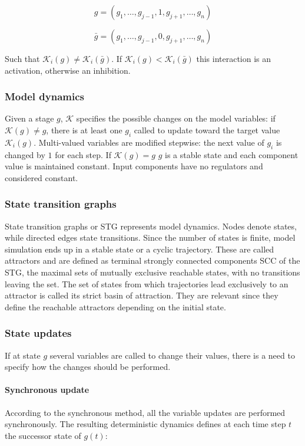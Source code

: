     $$g = (g_1, \dots, g_{j-1}, 1, g_{j+1}, \dots, g_n)$$

    $$\bar{g} = (g_1, \dots, g_{j-1}, 0, g_{j+1}, \dots, g_n)$$

    Such that $\mathcal{K}_i(g)\neq\mathcal{K}_i(\bar{g})$.
    If $\mathcal{K}_i(g)<\mathcal{K}_i(\bar{g})$ this interaction is an activation, otherwise an inhibition.

    \subsubsection{Model dynamics}
    Given a stage $g$, $\mathcal{K}$ specifies the possible changes on the model variables: if $\mathcal{K}(g)\neq g$, there is at least one $g_i$ called to update toward the target value $\mathcal{K}_i(g)$.
    Multi-valued variables are modified stepwise: the next value of $g_i$ is changed by $1$ for each step.
    If $\mathcal{K}(g) = g$ $g$ is a stable state and each component value is maintained constant.
    Input components have no regulators and considered constant.

    \subsubsection{State transition graphs}
    State transition graphs or STG represents model dynamics.
    Nodes denote states, while directed edges state transitions.
    Since the number of states is finite, model simulation ends up in a stable state or a cyclic trajectory.
    These are called attractors and are defined as terminal strongly connected components SCC of the STG, the maximal sets of mutually exclusive reachable states, with no transitions leaving the set.
    The set of states from which trajectories lead exclusively to an attractor is called its strict basin of attraction.
    They are relevant since they define the reachable attractors depending on the initial state.

    \subsubsection{State updates}
    If at state $g$ several variables are called to change their values, there is a need to specify how the changes should be performed.

    \paragraph{Synchronous update}
    According to the synchronous method, all the variable updates are performed synchronously.
    The resulting deterministic dynamics defines at each time step $t$ the successor state of $g(t)$:

